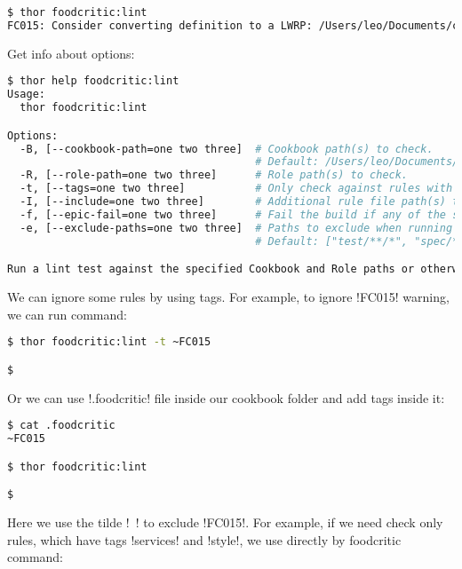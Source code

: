 \begin{lstlisting}[language=Bash,label=lst:testing-thor4]
$ thor foodcritic:lint
FC015: Consider converting definition to a LWRP: /Users/leo/Documents/chef_book/code/my-server-cloud/site-cookbooks/my_cool_app/definitions/enable_web_site.rb:1
\end{lstlisting}

Get info about options:

\begin{lstlisting}[language=Bash,label=lst:testing-thor5]
$ thor help foodcritic:lint
Usage:
  thor foodcritic:lint

Options:
  -B, [--cookbook-path=one two three]  # Cookbook path(s) to check.
                                       # Default: /Users/leo/Documents/chef_book/code/my-server-cloud/site-cookbooks/my_cool_app
  -R, [--role-path=one two three]      # Role path(s) to check.
  -t, [--tags=one two three]           # Only check against rules with the specified tags.
  -I, [--include=one two three]        # Additional rule file path(s) to load.
  -f, [--epic-fail=one two three]      # Fail the build if any of the specified tags are matched.
  -e, [--exclude-paths=one two three]  # Paths to exclude when running tests.
                                       # Default: ["test/**/*", "spec/**/*", "features/**/*"]

Run a lint test against the specified Cookbook and Role paths or otherwise your current working directory.
\end{lstlisting}

We can ignore some rules by using tags. For example, to ignore \inline!FC015! warning, we can run command:

\begin{lstlisting}[language=Bash,label=lst:testing-thor6]
$ thor foodcritic:lint -t ~FC015

$
\end{lstlisting}

Or we can use \inline!.foodcritic! file inside our cookbook folder and add tags inside it:

\begin{lstlisting}[language=Bash,label=lst:testing-thor7]
$ cat .foodcritic
~FC015

$ thor foodcritic:lint

$
\end{lstlisting}

Here we use the tilde \inline!~! to exclude \inline!FC015!.
For example, if we need check only rules, which have tags \inline!services! and \inline!style!, we use directly by foodcritic command:

